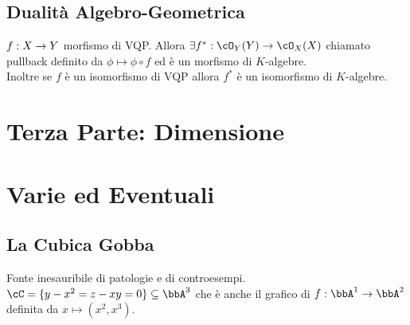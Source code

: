 \documentclass[a4paper,NoNotes,GeneralMath]{stdmdoc}
\begin{document}
	\subsection*{Dualità Algebro-Geometrica}
	$f: X \rightarrow Y$ morfismo di VQP. Allora $\exists f^{*}: \cO_Y(Y) \rar \cO_X(X)$ chiamato pullback definito da $\phi \mapsto \phi \circ f$ ed è un morfismo di $K$-algebre. \\
	Inoltre se $f$ è un isomorfismo di VQP allora $f^{*}$ è un isomorfismo di $K$-algebre.
	
	\section*{Terza Parte: Dimensione}
	
	
	\section*{Varie ed Eventuali}
	\subsection*{La Cubica Gobba}
	Fonte inesauribile di patologie e di controesempi. $\cC = \{ y-x^2 = z-xy = 0 \} \subseteq \bbA^3$ che è anche il grafico di $f: \bbA^1 \rar \bbA^2$ definita da $x \mapsto (x^2, x^3)$.
	
\end{document}
